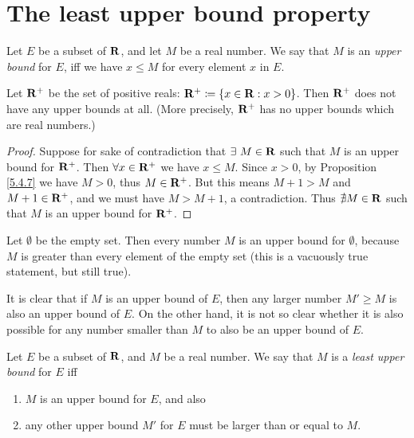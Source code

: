 \section{The least upper bound property}\label{sec 5.5}

\begin{definition}\label{5.5.1}
    Let \(E\) be a subset of \(\mathbf{R}\), and let \(M\) be a real number.
    We say that \(M\) is an \emph{upper bound} for \(E\), iff we have \(x \leq M\) for every element \(x\) in \(E\).
\end{definition}

\setcounter{theorem}{2}
\begin{example}\label{5.5.3}
    Let \(\mathbf{R}^+\) be the set of positive reals: \(\mathbf{R}^+ \coloneqq \{x \in \mathbf{R} : x > 0\}\).
    Then \(\mathbf{R}^+\) does not have any upper bounds at all.
    (More precisely, \(\mathbf{R}^+\) has no upper bounds which are real numbers.)
\end{example}

\begin{proof}
    Suppose for sake of contradiction that \(\exists\ M \in \mathbf{R}\) such that \(M\) is an upper bound for \(\mathbf{R}^+\).
    Then \(\forall x \in \mathbf{R}^+\) we have \(x \leq M\).
    Since \(x > 0\), by Proposition \ref{5.4.7} we have \(M > 0\), thus \(M \in \mathbf{R}^+\).
    But this means \(M + 1 > M\) and \(M + 1 \in \mathbf{R}^+\), and we must have \(M > M + 1\), a contradiction.
    Thus \(\nexists M \in \mathbf{R}\) such that \(M\) is an upper bound for \(\mathbf{R}^+\).
\end{proof}

\begin{example}\label{5.5.4}
    Let \(\emptyset\) be the empty set.
    Then every number \(M\) is an upper bound for \(\emptyset\), because \(M\) is greater than every element of the empty set
    (this is a vacuously true statement, but still true).
\end{example}

\begin{note}
    It is clear that if \(M\) is an upper bound of \(E\), then any larger number \(M' \geq M\) is also an upper bound of \(E\).
    On the other hand, it is not so clear whether it is also possible for any number smaller than \(M\) to also be an upper bound of \(E\).
\end{note}

\begin{definition}\label{5.5.5}
    Let \(E\) be a subset of \(\mathbf{R}\), and \(M\) be a real number.
    We say that \(M\) is a \emph{least upper bound} for \(E\) iff
    \begin{enumerate}
        \item \(M\) is an upper bound for \(E\), and also
        \item any other upper bound \(M'\) for \(E\) must be larger than or equal to \(M\).
    \end{enumerate}
\end{definition}

